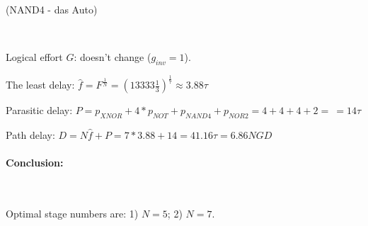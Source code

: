 \documentclass[12pt]{article}
\begin{document}
(NAND4 - das Auto)

\

Logical effort $G$: doesn't change ($g_{inv}=1$).

The least delay: $\hat{f} = F^{\frac{1}{N}} = (13333 \frac{1}{3})^{\frac{1}{7}} \approx 3.88\tau $

Parasitic delay: $P = p_{XNOR} + 4*p_{NOT} + p_{NAND4} + p_{NOR2} = 4 + 4 + 4 + 2 = \ = 14\tau$

Path delay: $D = N\hat{f}+P = 7*3.88+14 = 41.16\tau = 6.86 NGD$

\paragraph{Conclusion:}
\

Optimal stage numbers are: 1) $N=5$;  2) $N=7$.
\end{document}
